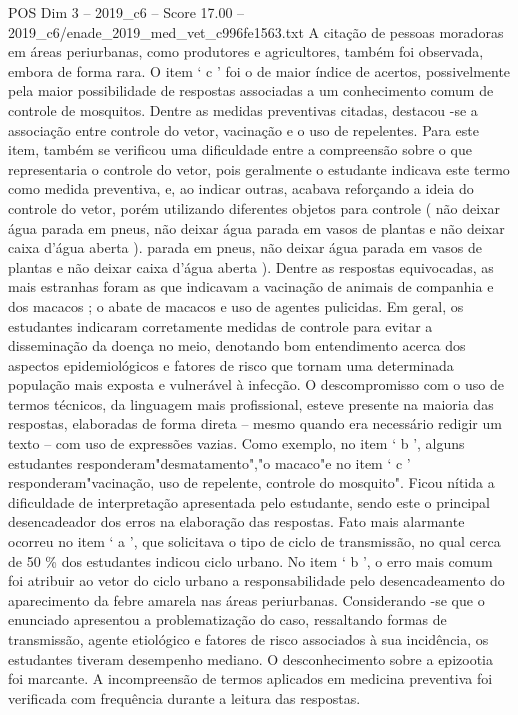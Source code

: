 \begin{textsample}{POS Dim 3 – 2019\_c6 – Score 17.00 – 2019\_c6/enade\_2019\_med\_vet\_c996fe1563.txt}
A citação de pessoas moradoras em áreas periurbanas, como produtores e agricultores, também foi observada, embora de forma rara.
O item ‘ c ’ foi o de maior índice de acertos, possivelmente pela maior possibilidade de respostas associadas a um conhecimento comum de controle de mosquitos.
Dentre as medidas preventivas citadas, destacou -se a associação entre controle do vetor, vacinação e o uso de repelentes.
Para este item, também se verificou uma dificuldade entre a compreensão sobre o que representaria o controle do vetor, pois geralmente o estudante indicava este termo como medida preventiva, e, ao indicar outras, acabava reforçando a ideia do controle do vetor, porém utilizando diferentes objetos para controle ( não deixar água parada em pneus, não deixar água parada em vasos de plantas e não deixar caixa d’água aberta ). parada em pneus, não deixar água parada em vasos de plantas e não deixar caixa d’água aberta ).
Dentre as respostas equivocadas, as mais estranhas foram as que indicavam a vacinação de animais de companhia e dos macacos ; o abate de macacos e uso de agentes pulicidas.
Em geral, os estudantes indicaram corretamente medidas de controle para evitar a disseminação da doença no meio, denotando bom entendimento acerca dos aspectos epidemiológicos e fatores de risco que tornam uma determinada população mais exposta e vulnerável à infecção.
O descompromisso com o uso de termos técnicos, da linguagem mais profissional, esteve presente na maioria das respostas, elaboradas de forma direta – mesmo quando era necessário redigir um texto – com uso de expressões vazias.
Como exemplo, no item ‘ b ’, alguns estudantes responderam"desmatamento","o macaco"e no item ‘ c ’ responderam"vacinação, uso de repelente, controle do mosquito".
Ficou nítida a dificuldade de interpretação apresentada pelo estudante, sendo este o principal desencadeador dos erros na elaboração das respostas.
Fato mais alarmante ocorreu no item ‘ a ’, que solicitava o tipo de ciclo de transmissão, no qual cerca de 50 \% dos estudantes indicou ciclo urbano.
No item ‘ b ’, o erro mais comum foi atribuir ao vetor do ciclo urbano a responsabilidade pelo desencadeamento do aparecimento da febre amarela nas áreas periurbanas.
Considerando -se que o enunciado apresentou a problematização do caso, ressaltando formas de transmissão, agente etiológico e fatores de risco associados à sua incidência, os estudantes tiveram desempenho mediano.
O desconhecimento sobre a epizootia foi marcante.
A incompreensão de termos aplicados em medicina preventiva foi verificada com frequência durante a leitura das respostas.

\end{textsample}

